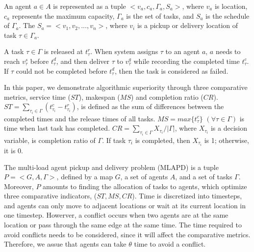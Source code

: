 \documentclass[sigconf,anonymous]{aamas}
\begin{document}

\begin{definition}[Agent]
\label{AgentDfn}
    An agent $a \in A$ is represented as a tuple $<v_{a}, c_{a}, \Gamma_{a}, S_{a}>$, 
    where $v_{a}$ is location, $c_{a}$ represents the maximum capacity, 
    $\Gamma_{a}$ is the set of tasks, and $S_{a}$ is the schedule of $\Gamma_{a}$. 
    The $S_{a} = <v_{1}, v_{2},..., v_{n}>$, 
    where $v_{i}$ is a pickup or delivery location of task $\tau \in \Gamma_{a}$.
\end{definition}

A task $\tau \in \Gamma$ is released at $t^{r}_{\tau}$. 
When system assigns $\tau$ to an agent $a$, 
$a$ needs to reach $v^{s}_{\tau}$ before $t^{d}_{\tau}$, 
and then deliver $\tau$ to $v^g_{\tau}$ while recording the completed time $t^{c}_{\tau}$. 
If $\tau$ could not be completed before $t^{d}_{\tau}$, 
then the task is considered as failed.

\begin{definition}
    In this paper, we demonstrate algorithmic superiority through three comparative metrics, 
    service time (${ST}$), makespan ($MS$) and completion ratio ($CR$). 
    $ST = \sum_{\tau_i \in \Gamma}{(t^{c}_{\tau_i} - t^{r}_{\tau_i})}$, 
    is defined as the sum of differences between the completed times and the release times of all tasks.
    $MS = max{\{t^{c}_{\tau}\}}$ $(\forall \tau \in \Gamma)$ 
    is time when last task has completed.
    $CR = {\sum_{\tau_i \in \Gamma}{X_{\tau_i}}}/{|\Gamma|}$, 
    where $X_{\tau_i}$ is a decision variable, is completion ratio of $\Gamma$. 
    If task $\tau_{i}$ is completed, then $X_{\tau_i}$ is 1; otherwise, it is 0.
    
    
\end{definition}

\begin{definition}[MLAPD]
\label{ProDfn}
    The multi-load agent pickup and delivery problem (MLAPD) is a tuple $P = <G, A, \Gamma>$, 
    defined by a map $G$, a set of agents $A$, and a set of tasks $\Gamma$. 
    Moreover, $P$ amounts to finding the allocation of tasks to agents, 
    which optimize three comparative indicators, ($ST, MS, CR$).
    Time is discretized into timesteps, and agents can only move to adjacent locations 
    or wait at its current location in one timestep.
    Howerver, a conflict occurs when two agents are at the same location or pass through the same edge at the same time.
    The time required to avoid conflicts needs to be considered, since it will affect the comparative metrics.
    Therefore, we assue that agents can take $\theta$ time to avoid a conflict.
\end{definition}
 
\end{document}

